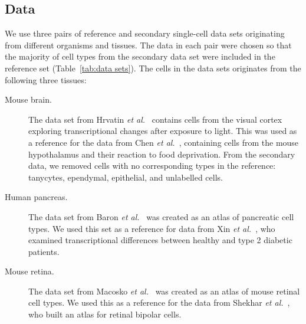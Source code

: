 \documentclass[runningheads]{llncs}
\newcommand{\etal}{\textit{et al.}}
\begin{document}
\subsection{Data}

We use three pairs of reference and secondary single-cell data sets originating
from different organisms and tissues. The data in each pair were chosen so that
the majority of cell types from the secondary data set were included in the
reference set (Table~\ref{tab:data sets}).
The cells in the data sets originates from the following three tissues:

\begin{description}
\item[Mouse brain.] The data set from Hrvatin \etal~\cite{hrvatin2018} contains
cells from the visual cortex exploring transcriptional changes after exposure
to light. This was used as a reference for the data from Chen
\etal~\cite{chen2017}, containing cells from the mouse hypothalamus and
their reaction to food deprivation. From the secondary data, we removed cells
with no corresponding types in the reference: tanycytes, ependymal,
epithelial, and unlabelled cells.

\item[Human pancreas.] The data set from Baron \etal~\cite{baron2016} was
created as an atlas of pancreatic cell types. We used this set as a reference
for data from Xin \etal~\cite{xin2016}, who examined transcriptional
differences between healthy and type 2 diabetic patients.

\item[Mouse retina.] The data set from Macosko \etal~\cite{macosko2015} was
created as an atlas of mouse retinal cell types. We used this as a reference
for the data from Shekhar \etal~\cite{shekhar2016}, who built an atlas for retinal bipolar cells.
\end{description}
\end{document}
